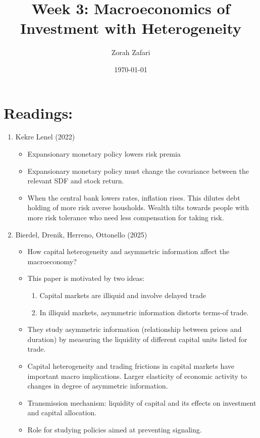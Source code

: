\documentclass[10pt]{article}
\title{Week 3: Macroeconomics of Investment with Heterogeneity}
\author{Zorah Zafari}
\date{\today}
\begin{document}
\maketitle

\section{Readings:}
\begin{enumerate}
    \item Kekre Lenel (2022)
    \begin{itemize}
        \item Expansionary monetary policy lowers risk premia 
        \item Expansionary monetary policy must change the covariance between the relevant SDF and stock return. 
        \item When the central bank lowers rates, inflation rises. This dilutes debt holding of more risk averse housholds. Wealth tilts towards people with more risk tolerance who need less compensation for taking risk. 
    \end{itemize}
    \item Bierdel, Drenik, Herreno, Ottonello (2025)
    \begin{itemize}
        \item How capital heterogeneity and asymmetric information affect the macroeconomy? 
        \item This paper is motivated by two ideas: 
        \begin{enumerate}
            \item Capital markets are illiquid and involve delayed trade
            \item In illiquid markets, asymmetric information distorts terms-of trade. 
        \end{enumerate}
        \item They study asymmetric information (relationship between prices and duration) by measuring the liquidity of different capital units listed for trade. 
        \item Capital heterogeneity and trading frictions in capital markets have important macro implications. Larger elasticity of economic activity to changes in degree of asymmetric information. 
        \item Transmission mechanism: liquidity of capital and its effects on investment and capital allocation. 
        \item Role for studying policies aimed at preventing signaling.
    \end{itemize}


\end{enumerate}
\end{document}

